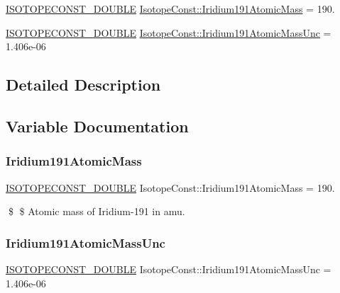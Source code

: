 \begin{DoxyCompactItemize}
\item 
\mbox{\hyperlink{group___isotope_const-_macros_ga8f45a7272ce02c0b4c65c44636ed719a}{I\+S\+O\+T\+O\+P\+E\+C\+O\+N\+S\+T\+\_\+\+D\+O\+U\+B\+LE}} \mbox{\hyperlink{group___isotope_const-_iridium-_ir191_ga6dd6db752512cc87b09c7ae2916472d9}{Isotope\+Const\+::\+Iridium191\+Atomic\+Mass}} = 190.
\item 
\mbox{\hyperlink{group___isotope_const-_macros_ga8f45a7272ce02c0b4c65c44636ed719a}{I\+S\+O\+T\+O\+P\+E\+C\+O\+N\+S\+T\+\_\+\+D\+O\+U\+B\+LE}} \mbox{\hyperlink{group___isotope_const-_iridium-_ir191_ga30b222db49bdb9c571209b99525e957b}{Isotope\+Const\+::\+Iridium191\+Atomic\+Mass\+Unc}} = 1.\+406e-\/06
\end{DoxyCompactItemize}


\subsection{Detailed Description}


\subsection{Variable Documentation}
\mbox{\label{group___isotope_const-_iridium-_ir191_ga6dd6db752512cc87b09c7ae2916472d9}} 
\subsubsection{\texorpdfstring{Iridium191\+Atomic\+Mass}{Iridium191AtomicMass}}
{\footnotesize\ttfamily \mbox{\hyperlink{group___isotope_const-_macros_ga8f45a7272ce02c0b4c65c44636ed719a}{I\+S\+O\+T\+O\+P\+E\+C\+O\+N\+S\+T\+\_\+\+D\+O\+U\+B\+LE}} Isotope\+Const\+::\+Iridium191\+Atomic\+Mass = 190.}

\$ \$ Atomic mass of Iridium-\/191 in amu. \mbox{\label{group___isotope_const-_iridium-_ir191_ga30b222db49bdb9c571209b99525e957b}} 
\subsubsection{\texorpdfstring{Iridium191\+Atomic\+Mass\+Unc}{Iridium191AtomicMassUnc}}
{\footnotesize\ttfamily \mbox{\hyperlink{group___isotope_const-_macros_ga8f45a7272ce02c0b4c65c44636ed719a}{I\+S\+O\+T\+O\+P\+E\+C\+O\+N\+S\+T\+\_\+\+D\+O\+U\+B\+LE}} Isotope\+Const\+::\+Iridium191\+Atomic\+Mass\+Unc = 1.\+406e-\/06}

